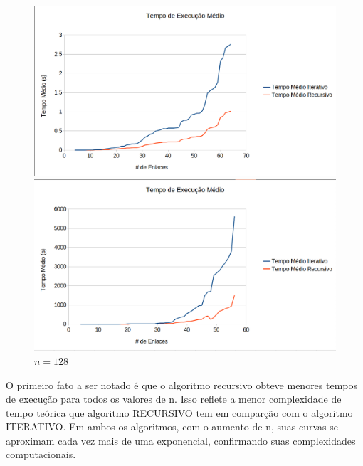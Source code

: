 \begin{figure}[ht]
\begin{minipage}[b]{0.5\linewidth}
    \caption{$n=32$} 
    \vspace{4ex}
  \end{minipage} 
  \begin{minipage}[b]{0.5\linewidth}
    \centering
    \includegraphics[width=1\linewidth]{figs/tempo64.png} 
    \caption{$n=64$} 
    \vspace{4ex}
  \end{minipage}%
  \begin{minipage}[b]{0.5\linewidth}
    \centering
    \includegraphics[width=1\linewidth]{figs/tempo128.png} 
    \caption{$n=128$} 
    \vspace{4ex}
  \end{minipage} 
\end{figure}

O primeiro fato a ser notado é que o algoritmo recursivo obteve menores tempos de execução para todos os valores de n. Isso reflete a menor complexidade de tempo teórica que algoritmo RECURSIVO tem em comparção com o algoritmo ITERATIVO. Em ambos os algoritmos, com o aumento de n, suas curvas se aproximam cada vez mais de uma exponencial, confirmando suas complexidades computacionais.

